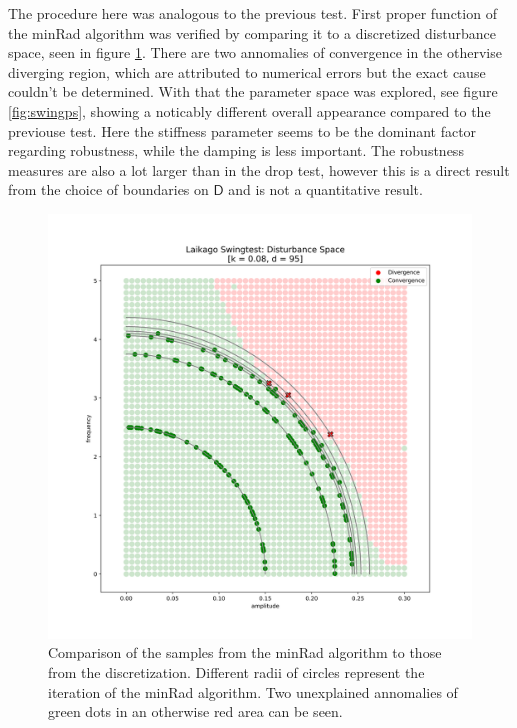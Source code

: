     The procedure here was analogous to the previous test. First proper function of the minRad algorithm was verified by comparing it to a discretized disturbance space, seen in figure \ref{fig:swingoverlay}. There are two annomalies of convergence in the othervise diverging region, which are attributed to numerical errors but the exact cause couldn't be determined. With that the parameter space was explored, see figure \ref{fig:swingps}, showing a noticably different overall appearance compared to the previouse test. Here the stiffness parameter seems to be the dominant factor regarding robustness, while the damping is less important. The robustness measures are also a lot larger than in the drop test, however this is a direct result from the choice of boundaries on $\mathsf{D}$ and is not a quantitative result.   
    \begin{figure}[h]\label{fig:swingoverlay}
    \centering
    \includegraphics[width=.6\linewidth]{figures/swingtest_ds_overay_v3.png}
    \caption[Overlay of minRad and Discretized Disturbance Space, Swing Test]{Comparison of the samples from the minRad algorithm to those from the discretization. Different radii of circles represent the iteration of the minRad algorithm. Two unexplained annomalies of green dots in an otherwise red area can be seen.}
    \end{figure}    

